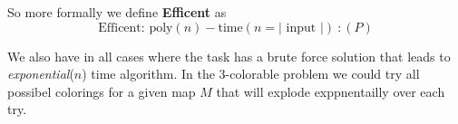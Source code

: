 \documentclass[twoside,11pt]{article}
\numberwithin{figure}{section}
\begin{document}
So more formally we define \textbf{Efficent} as 
\[
    \text{Efficent: } \text{poly}(n)-\text{time} (n = \vert \text{ input } \vert) \:: (P)
 \]

 We also have in all cases where the task has a brute force solution that leads to \emph{exponential}($n$) time algorithm. In the 3-colorable problem we could try all possibel colorings for a given map $M$ that will explode exppnentailly over each try.
\end{document}
